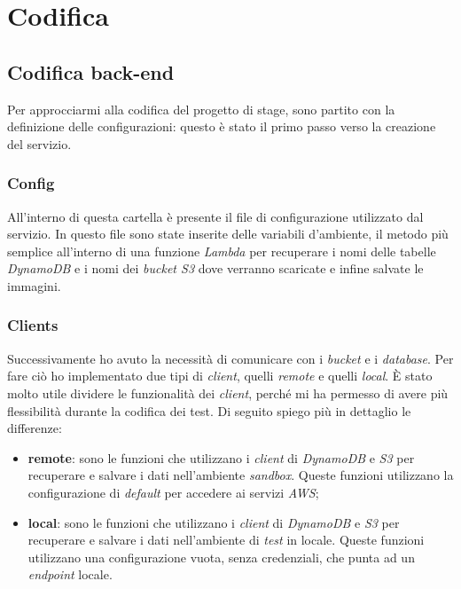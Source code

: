 \chapter{Codifica}
\label{cap:codifica}


\section{Codifica back-end}

Per approcciarmi alla codifica del progetto di stage, sono partito con la
definizione delle configurazioni: questo è stato il primo passo verso la
creazione del servizio.

\subsection{Config}

All'interno di questa cartella è presente il file di configurazione utilizzato
dal servizio. In questo file sono state inserite delle variabili d'ambiente, il
metodo più semplice all'interno di una funzione \emph{Lambda} per recuperare i nomi delle tabelle \emph{DynamoDB}
e i nomi dei \emph{bucket S3} dove verranno scaricate e infine salvate le immagini.

\subsection{Clients}
Successivamente ho avuto la necessità di comunicare con i \emph{bucket} e i
\emph{database}. Per fare ciò ho implementato due tipi di \emph{client}, quelli
\emph{remote} e quelli \emph{local}. È stato molto utile dividere le
funzionalità dei \emph{client}, perché mi ha permesso di avere più flessibilità durante
la codifica dei test. Di seguito spiego più in dettaglio le differenze:
\begin{itemize}
      \item \textbf{remote}: sono le funzioni che utilizzano i \emph{client} di
            \emph{DynamoDB} e \emph{S3} per recuperare e salvare i dati nell'ambiente
            \emph{sandbox}. Queste funzioni utilizzano la configurazione di
            \emph{default} per accedere ai servizi \emph{AWS};
      \item \textbf{local}: sono le funzioni che utilizzano i \emph{client} di
            \emph{DynamoDB} e \emph{S3} per recuperare e salvare i dati nell'ambiente di
            \emph{test} in locale. Queste funzioni utilizzano una configurazione vuota,
            senza credenziali, che punta ad un \emph{endpoint} locale.
\end{itemize}

